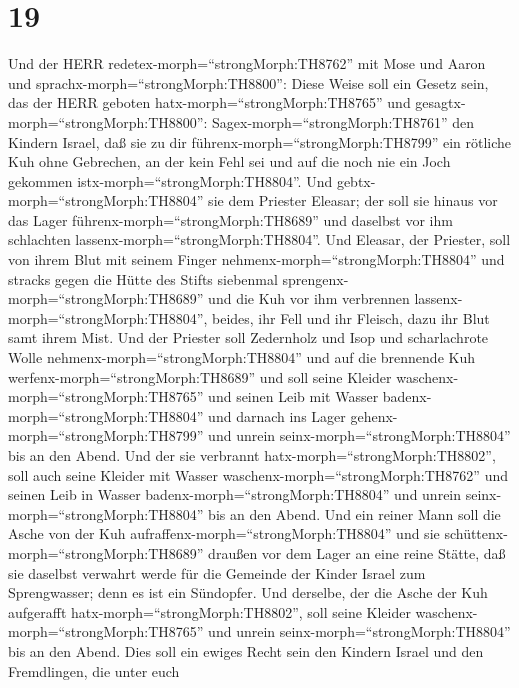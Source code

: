 \hypertarget{section-18}{%
\section{19}\label{section-18}}

 Und der HERR redetex-morph=``strongMorph:TH8762'' mit Mose
und Aaron und sprachx-morph=``strongMorph:TH8800'':  Diese
Weise soll ein Gesetz sein, das der HERR geboten
hatx-morph=``strongMorph:TH8765'' und
gesagtx-morph=``strongMorph:TH8800'': Sagex-morph=``strongMorph:TH8761''
den Kindern Israel, daß sie zu dir führenx-morph=``strongMorph:TH8799''
ein rötliche Kuh ohne Gebrechen, an der kein Fehl sei und auf die noch
nie ein Joch gekommen istx-morph=``strongMorph:TH8804''. 
Und gebtx-morph=``strongMorph:TH8804'' sie dem Priester Eleasar; der
soll sie hinaus vor das Lager führenx-morph=``strongMorph:TH8689'' und
daselbst vor ihm schlachten lassenx-morph=``strongMorph:TH8804''.
 Und Eleasar, der Priester, soll von ihrem Blut mit seinem
Finger nehmenx-morph=``strongMorph:TH8804'' und stracks gegen die Hütte
des Stifts siebenmal sprengenx-morph=``strongMorph:TH8689'' 
und die Kuh vor ihm verbrennen lassenx-morph=``strongMorph:TH8804'',
beides, ihr Fell und ihr Fleisch, dazu ihr Blut samt ihrem Mist.
 Und der Priester soll Zedernholz und Isop und scharlachrote
Wolle nehmenx-morph=``strongMorph:TH8804'' und auf die brennende Kuh
werfenx-morph=``strongMorph:TH8689''  und soll seine Kleider
waschenx-morph=``strongMorph:TH8765'' und seinen Leib mit Wasser
badenx-morph=``strongMorph:TH8804'' und darnach ins Lager
gehenx-morph=``strongMorph:TH8799'' und unrein
seinx-morph=``strongMorph:TH8804'' bis an den Abend.  Und
der sie verbrannt hatx-morph=``strongMorph:TH8802'', soll auch seine
Kleider mit Wasser waschenx-morph=``strongMorph:TH8762'' und seinen Leib
in Wasser badenx-morph=``strongMorph:TH8804'' und unrein
seinx-morph=``strongMorph:TH8804'' bis an den Abend.  Und
ein reiner Mann soll die Asche von der Kuh
aufraffenx-morph=``strongMorph:TH8804'' und sie
schüttenx-morph=``strongMorph:TH8689'' draußen vor dem Lager an eine
reine Stätte, daß sie daselbst verwahrt werde für die Gemeinde der
Kinder Israel zum Sprengwasser; denn es ist ein Sündopfer. 
Und derselbe, der die Asche der Kuh aufgerafft
hatx-morph=``strongMorph:TH8802'', soll seine Kleider
waschenx-morph=``strongMorph:TH8765'' und unrein
seinx-morph=``strongMorph:TH8804'' bis an den Abend. Dies soll ein
ewiges Recht sein den Kindern Israel und den Fremdlingen, die unter euch

